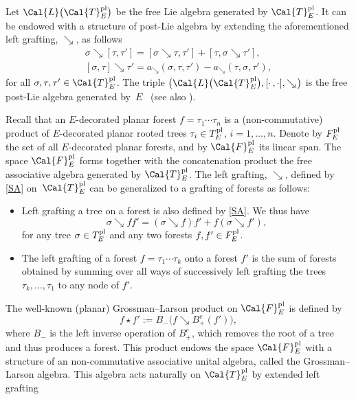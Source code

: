 \documentclass[10pt,a4paper]{amsart}
\numberwithin{equation}{section}
\begin{document}
Let $\Cal{L}\big(\Cal{T}^{\rm pl}_{E}\big)$ be the free Lie algebra generated by $\Cal{T}^{\rm pl}_{E}$. It can be endowed with a structure of post-Lie algebra by extending the aforementioned left grafting, $\searrow$, as follows
\begin{gather*}
\sigma \searrow [ \tau, \tau']
 = [ \sigma \searrow \tau, \tau'] + [ \tau, \sigma \searrow \tau'],
\\
[\sigma,\tau] \searrow \tau'
 = a_{\searrow}(\sigma, \tau, \tau') - a_{\searrow}(\tau, \sigma, \tau'),
\end{gather*}
for all $\sigma, \tau, \tau' \in \Cal{T}^{\rm pl}_E$. The triple $\big(\Cal{L}\big(\Cal{T}^{\rm pl}_E\big), [\cdot\,,\cdot ], \searrow\!\big)$ is the free post-Lie algebra generated by~$E$~\cite{BV2007} (see also \cite{HA13,MKW08}).

Recall that an $E$-decorated planar forest $f=\tau_1 \cdots \tau_n$ is a (non-commutative) product of $E$-decorated planar rooted trees $\tau_i\in T_E^{\rm pl}$, $i=1,\ldots ,n$. Denote by $F^{\rm pl}_{E}$ the set of all $E$-decorated planar forests, and by $\Cal{F}^{\rm pl}_{E}$ its linear span. The space $\Cal{F}^{\rm pl}_{E}$ forms together with the concatenation product the free associative algebra generated by $\Cal{T}^{\rm pl}_{E}$. The left grafting, $\searrow$, defined by \eqref{SA} on~$\Cal{T}^{\rm pl}_{E}$ can be generalized to a grafting of forests as follows:
\begin{itemize}\itemsep=0pt
\item Left grafting a tree on a forest is also defined by \eqref{SA}. We thus have
\begin{displaymath}
\sigma\searrow{ff'}=(\sigma\searrow f)f'+f(\sigma\searrow f'),
\end{displaymath}
for any tree $\sigma\in T_E^{\rm pl}$ and any two forests $f,f'\in F_E^{\rm pl}$.

\item The left grafting of a forest $f =\tau_1\cdots\tau_k$ onto a forest $f'$ is the sum of forests obtained by summing over all ways of successively left grafting the trees $\tau_k,\ldots,\tau_1$ to any node of $f'$.
\end{itemize}
The well-known (planar) Grossman--Larson product on $\Cal{F}^{\rm pl}_{E}$ is defined by \cite{GL1989}
\begin{equation}
\label{glf}
f \star f' := B_{-}\big(f \searrow B^e_{+}(f')\big),
\end{equation}
where $B_{-}$ is the left inverse operation of $B^e_{+}$, which removes the root of a tree and thus produces a forest. This product endows the space $\Cal{F}^{\rm pl}_{E}$ with a structure of an non-commutative associative unital algebra, called the Grossman--Larson algebra. This algebra acts naturally on $\Cal{T}^{\rm pl}_{E}$ by extended left grafting
\end{document}

